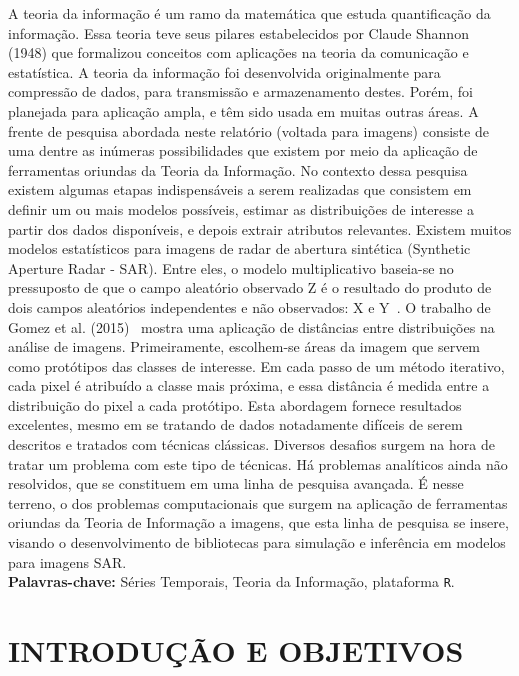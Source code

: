 \documentclass[12pt,letterpaper]{article}
\begin{document}
	A teoria da informação é um ramo da matemática que estuda quantificação da informação. Essa teoria teve seus pilares estabelecidos por Claude Shannon (1948) que formalizou conceitos com aplicações na teoria da comunicação e estatística. A teoria da informação foi desenvolvida originalmente para compressão de dados, para transmissão e armazenamento destes. Porém, foi planejada para aplicação ampla, e têm sido usada em muitas outras áreas. A frente de pesquisa abordada neste relatório (voltada para imagens) consiste de uma dentre as inúmeras possibilidades que existem por meio da aplicação de ferramentas oriundas da Teoria da Informação. No contexto dessa pesquisa existem algumas etapas indispensáveis a serem realizadas que consistem em definir um ou mais modelos possíveis, estimar as distribuições de interesse a partir dos dados disponíveis, e depois extrair atributos relevantes. Existem muitos modelos estatísticos para imagens de radar de abertura sintética (Synthetic Aperture Radar - SAR). Entre eles, o modelo multiplicativo baseia-se no pressuposto de que o campo aleatório observado Z é o resultado do produto de dois campos aleatórios independentes e não observados: X e Y~\cite{ClassificationSARImages}. O trabalho de Gomez et al. (2015)~\cite{Gomez} mostra uma aplicação de distâncias entre distribuições na análise de imagens. Primeiramente, escolhem-se áreas da imagem que servem como protótipos das classes de interesse. Em cada passo de um método iterativo, cada pixel é atribuído a classe mais próxima, e essa distância é medida entre a distribuição do pixel a cada protótipo. Esta abordagem fornece resultados excelentes, mesmo em se tratando de dados notadamente difíceis de serem descritos e tratados com técnicas clássicas. Diversos desafios surgem na hora de tratar um problema com este tipo de técnicas. Há problemas analíticos ainda não resolvidos, que se constituem em uma linha de pesquisa avançada. É nesse terreno, o dos problemas computacionais que surgem na aplicação de ferramentas oriundas da Teoria de Informação a imagens, que esta linha de pesquisa se insere, visando o desenvolvimento de bibliotecas para simulação e inferência em modelos para imagens SAR.\\

\textbf{Palavras-chave:} Séries Temporais, Teoria da Informação, plataforma \texttt R.


\newpage
\section*{\centering \textbf{INTRODUÇÃO E OBJETIVOS}} %
\end{document}
